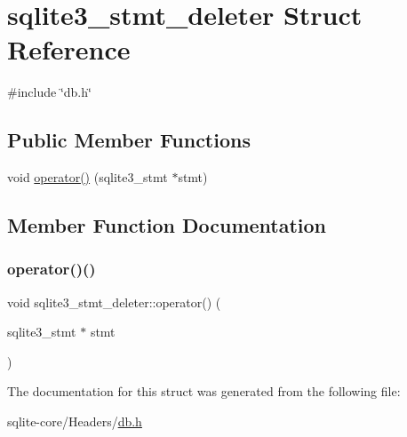 \hypertarget{structsqlite3__stmt__deleter}{}\section{sqlite3\+\_\+stmt\+\_\+deleter Struct Reference}
\label{structsqlite3__stmt__deleter}


{\ttfamily \#include \char`\"{}db.\+h\char`\"{}}

\subsection*{Public Member Functions}
\begin{DoxyCompactItemize}
\item 
void \mbox{\hyperlink{structsqlite3__stmt__deleter_a0d25181a866b19111f63cce0fce0c789}{operator()}} (sqlite3\+\_\+stmt $\ast$stmt)
\end{DoxyCompactItemize}


\subsection{Member Function Documentation}
\mbox{\label{structsqlite3__stmt__deleter_a0d25181a866b19111f63cce0fce0c789}} 
\subsubsection{\texorpdfstring{operator()()}{operator()()}}
{\footnotesize\ttfamily void sqlite3\+\_\+stmt\+\_\+deleter\+::operator() (\begin{DoxyParamCaption}\item[{sqlite3\+\_\+stmt $\ast$}]{stmt }\end{DoxyParamCaption})\hspace{0.3cm}{\ttfamily [inline]}}



The documentation for this struct was generated from the following file\+:\begin{DoxyCompactItemize}
\item 
sqlite-\/core/\+Headers/\mbox{\hyperlink{db_8h}{db.\+h}}\end{DoxyCompactItemize}
